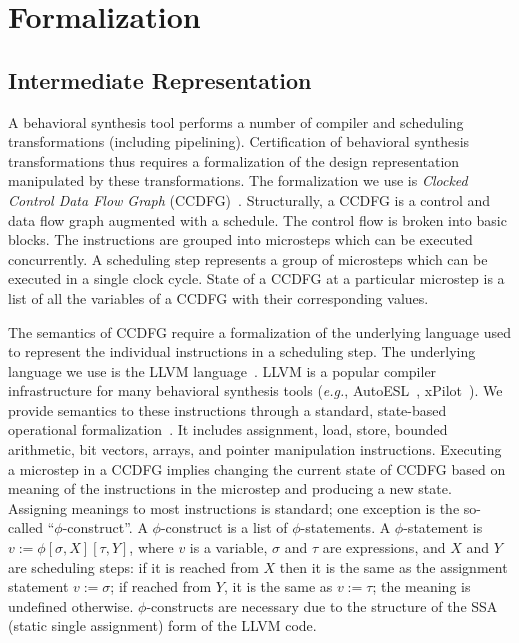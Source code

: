 \section{Formalization}
\label{sec:formalization}

\subsection{Intermediate Representation}
\label{subsec:ir}

A behavioral synthesis tool performs a number of compiler
and scheduling transformations (including pipelining). Certification of behavioral synthesis transformations thus requires a formalization of
the design representation manipulated by these
transformations. The formalization we use is {\em Clocked
  Control Data Flow Graph} (CCDFG)~\cite{rhcxy:atva-09}. 
Structurally, a CCDFG is a control and data flow graph augmented with a schedule. The control flow is broken into basic blocks. The instructions are grouped into microsteps which can be executed concurrently. A scheduling step represents a group of microsteps which can be executed in a single clock cycle. State of a CCDFG at a particular microstep is a list of all the variables of a CCDFG with their corresponding values. 

The semantics of CCDFG require a formalization of the
underlying language used to represent the individual
instructions in a scheduling step.  The underlying language we use
is the LLVM language~\cite{llvm}. LLVM is a popular compiler
infrastructure for many behavioral synthesis tools
({\em e.g.}, AutoESL~\cite{autoesl}, xPilot~\cite{xpilot}).  We provide semantics to these
instructions through a standard, state-based operational
formalization~\cite{McCarthy}. It includes assignment,
load, store, bounded arithmetic, bit vectors, arrays, and
pointer manipulation instructions. Executing a microstep in
a CCDFG implies changing the current state of CCDFG based on
meaning of the instructions in the microstep and producing a
new state. Assigning meanings to most instructions is
standard; one exception is the so-called ``$\phi$-construct''. A $\phi$-construct is a list of $\phi$-statements. A $\phi$-statement is $v := \phi [\sigma, X] [\tau, Y]$, where $v$ is a variable, $\sigma$
and $\tau$ are expressions, and $X$ and $Y$ are
scheduling steps: if it is reached from $X$ then it is the
same as the assignment statement $v := \sigma$; if
reached from $Y$, it is the same as $v := \tau$; the meaning is undefined otherwise. $\phi$-constructs are necessary due to the structure of the SSA (static single
assignment) form of the LLVM code.

